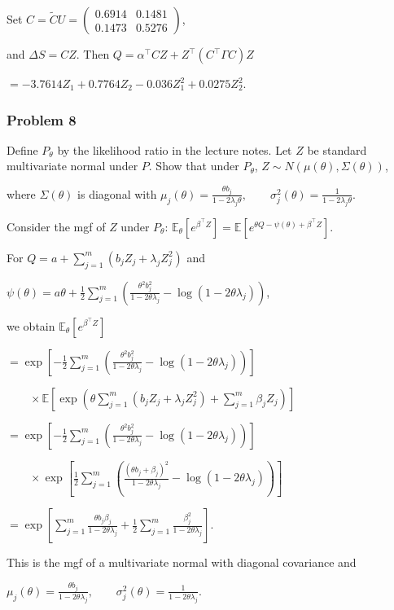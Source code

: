 Set
$C=\widetilde CU=\begin{pmatrix}0.6914&0.1481\\0.1473&0.5276\end{pmatrix}$,

and $\Delta S=CZ$. Then
$Q=\alpha^\top CZ+Z^\top(C^\top\Gamma C)Z$

$=-3.7614Z_1+0.7764Z_2-0.036Z_1^2+0.0275Z_2^2$.

\subsubsection*{Problem 8}

 Define $P_\theta$ by the likelihood ratio in the lecture notes. Let $Z$ be standard multivariate normal under $P$. Show that under $P_\theta$,
$Z\sim N(\mu(\theta),\Sigma(\theta))$,

where $\Sigma(\theta)$ is diagonal with
$\mu_j(\theta)=\frac{\theta b_j}{1-2\lambda_j\theta},\qquad \sigma_j^2(\theta)=\frac1{1-2\lambda_j\theta}$.

 Consider the mgf of $Z$ under $P_\theta$:
$\mathbb{E}_\theta[e^{\beta^\top Z}]=\mathbb{E}[e^{\theta Q-\psi(\theta)+\beta^\top Z}]$.

For $Q=a+\sum_{j=1}^m(b_jZ_j+\lambda_jZ_j^2)$ and

$\psi(\theta)=a\theta+\frac12\sum_{j=1}^m\left(\frac{\theta^2b_j^2}{1-2\theta\lambda_j}-\log(1-2\theta\lambda_j)\right)$,

we obtain
$\mathbb{E}_\theta[e^{\beta^\top Z}]$

$=\exp\left[-\frac12\sum_{j=1}^m\left(\frac{\theta^2b_j^2}{1-2\theta\lambda_j}-\log(1-2\theta\lambda_j)\right)\right]$

$\qquad\times\mathbb{E}\left[\exp\left(\theta\sum_{j=1}^m(b_jZ_j+\lambda_jZ_j^2)+\sum_{j=1}^m\beta_jZ_j\right)\right]$

$=\exp\left[-\frac12\sum_{j=1}^m\left(\frac{\theta^2b_j^2}{1-2\theta\lambda_j}-\log(1-2\theta\lambda_j)\right)\right]$

$\qquad\times\exp\left[\frac12\sum_{j=1}^m\left(\frac{(\theta b_j+\beta_j)^2}{1-2\theta\lambda_j}-\log(1-2\theta\lambda_j)\right)\right]$

$=\exp\left[\sum_{j=1}^m\frac{\theta b_j\beta_j}{1-2\theta\lambda_j}+\frac12\sum_{j=1}^m\frac{\beta_j^2}{1-2\theta\lambda_j}\right]$.

This is the mgf of a multivariate normal with diagonal covariance and

$\mu_j(\theta)=\frac{\theta b_j}{1-2\theta\lambda_j},\qquad \sigma_j^2(\theta)=\frac1{1-2\theta\lambda_j}$.

